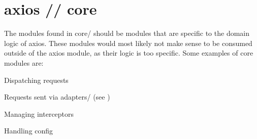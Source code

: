 \chapter{axios // core}
\hypertarget{md_node__modules_2axios_2lib_2core_2_r_e_a_d_m_e}{}\label{md_node__modules_2axios_2lib_2core_2_r_e_a_d_m_e}
\label{md_node__modules_2axios_2lib_2core_2_r_e_a_d_m_e_autotoc_md151}%
%
 The modules found in {\ttfamily core/} should be modules that are specific to the domain logic of axios. These modules would most likely not make sense to be consumed outside of the axios module, as their logic is too specific. Some examples of core modules are\+:


\begin{DoxyItemize}
\item Dispatching requests
\begin{DoxyItemize}
\item Requests sent via {\ttfamily adapters/} (see )
\end{DoxyItemize}
\item Managing interceptors
\item Handling config 
\end{DoxyItemize}